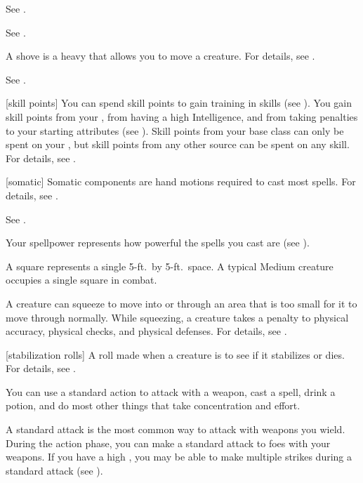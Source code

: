  See .

 See .

 A shove is a heavy  that allows you to move a creature.
For details, see .

 See .

[skill points] You can spend skill points to gain training in skills (see ).
You gain skill points from your , from having a high Intelligence, and from taking penalties to your starting attributes (see ).
Skill points from your base class can only be spent on your , but skill points from any other source can be spent on any skill.
For details, see .

[somatic] Somatic components are hand motions required to cast most spells.
For details, see .

 See .

 Your spellpower represents how powerful the spells you cast are (see ).

 A square represents a single 5-ft.\ by 5-ft.\ space.
A typical Medium creature occupies a single square in combat.

 A creature can squeeze to move into or through an area that is too small for it to move through normally.
While squeezing, a creature takes a  penalty to physical accuracy, physical checks, and physical defenses.
For details, see .

[stabilization rolls] A roll made when a creature is  to see if it stabilizes or dies. For details, see .

 You can use a standard action to attack with a weapon, cast a spell, drink a potion, and do most other things that take concentration and effort.

 A standard attack is the most common way to attack with weapons you wield.
During the action phase, you can make a standard attack to  foes with your weapons.
If you have a high , you may be able to make multiple strikes during a standard attack (see ).

